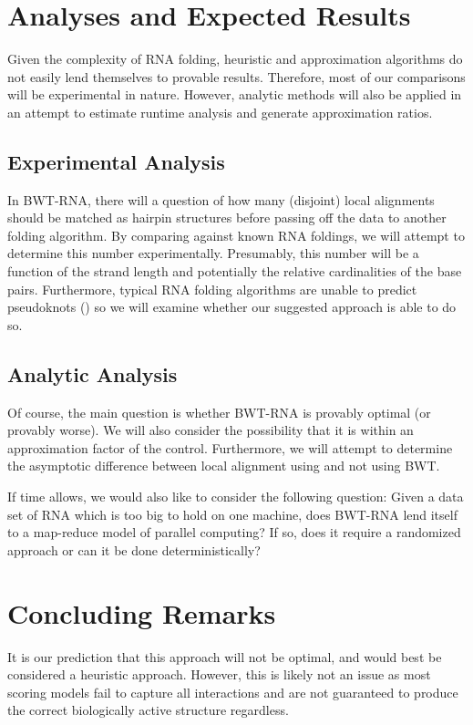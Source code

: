 \documentclass[11pt]{article}
\begin{document}
\section{Analyses and Expected Results}

	Given the complexity of RNA folding, heuristic and approximation algorithms do not easily lend themselves to provable results. Therefore, most of our comparisons will be experimental in nature.  However, analytic methods will also be applied in an attempt to estimate runtime analysis and generate approximation ratios. 

\subsection{Experimental Analysis}

In BWT-RNA, there will a question of how many (disjoint) local alignments should be matched as hairpin structures before passing off the data to another folding algorithm. By comparing against known RNA foldings, we will attempt to determine this number experimentally. Presumably, this number will be a function of the strand length and potentially the relative cardinalities of the base pairs. Furthermore, typical RNA folding algorithms are unable to predict pseudoknots (\cite{twelve}) so we will examine whether our suggested approach is able to do so. 

\subsection{Analytic Analysis}
	
	Of course, the main question is whether BWT-RNA is provably optimal (or provably worse). We will also consider the possibility that it is within an approximation factor of the control. Furthermore, we will attempt to determine the asymptotic difference between local alignment using and not using BWT. 

If time allows, we would also like to consider the following question: Given a data set of RNA which is too big to hold on one machine, does BWT-RNA lend itself to a map-reduce model of parallel computing? If so, does it require a randomized approach or can it be done deterministically? 

\section{Concluding Remarks}

It is our prediction that this approach will not be optimal, and would best be considered a heuristic approach. However, this is likely not an issue as most scoring models fail to capture all interactions and are not guaranteed to produce the correct biologically active structure regardless.



\end{document}
